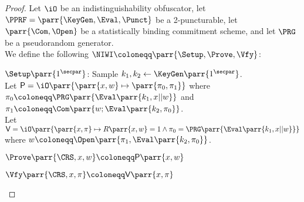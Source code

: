 \begin{proof}
    Let \(\iO\) be an indistinguishability obfuscator,
    let \(\PPRF = \parr{\KeyGen, \Eval, \Punct}\) be a 2-puncturable,
    let \(\parr{\Com,\Open}\) be a statistically binding commitment scheme,
    and let \(\PRG\) be a pseudorandom generator.
    \\
    We define the following \(\NIWI \coloneqq \parr{\Setup, \Prove, \Vfy}\):
    \begin{sitemize}
        \item \(\Setup\parr{1^\secpar}\):
        Sample \(k_1,k_2 \gets \KeyGen\parr{1^\secpar}\).
        \\
        Let \(\mathsf{P} = \iO\parr{\parr{x, w} \mapsto \parr{\pi_0,\pi_1}}\) where \(\pi_0 \coloneqq \PRG\parr{\Eval\parr{k_1,x||w}}\) and \(\pi_1 \coloneqq \Com\parr{w; \Eval\parr{k_2,\pi_0}}\).
        \\
        Let \(\mathsf{V} = \iO\parr{\parr{x, \pi} \mapsto R\parr{x,w} = 1 \wedge \pi_0 = \PRG\parr{\Eval\parr{k_1,x||w}}}\) where \(w \coloneqq \Open\parr{\pi_1, \Eval\parr{k_2,\pi_0}}\).

        \item \(\Prove\parr{\CRS,x,w} \coloneqq \mathsf{P}\parr{x,w}\)

        \item \(\Vfy\parr{\CRS,x,\pi} \coloneqq \mathsf{V}\parr{x,\pi}\)
    \end{sitemize}


\end{proof}
